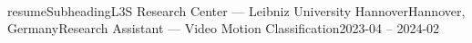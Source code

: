 \\resumeSubheading{L3S Research Center — Leibniz University Hannover}{Hannover, Germany}{Research Assistant — Video Motion Classification}{2023-04 -- 2024-02}
